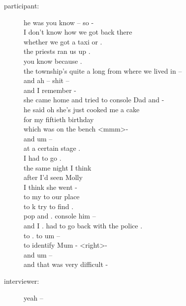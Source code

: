 \documentclass{article}
\newcommand{\turn}[2]{
\item[#1:] #2
}
\begin{document}
\begin{description}
\turn{participant}{he was you know -- so -\\
I don't know how we got back there\\
whether we got a taxi or .\\
the priests ran us up .\\
you know because .\\
the township's quite a long from where we lived in --\\
and ah -- shit --\\
and I remember -\\
she came home and tried to console Dad and -\\
he said oh she's just cooked me a cake\\
for my fiftieth birthday\\
which was on the bench \textless mmm\textgreater  -\\
and um --\\
at a certain stage .\\
I had to go .\\
the same night I think\\
after I'd seen Molly\\
I think she went -\\
to my to our place\\
to k try to find .\\
pop and . console him --\\
and I . had to go back with the police .\\
to . to um --\\
to identify Mum - \textless right\textgreater  -\\
and um --\\
and that was very difficult -}

\turn{interviewer}{yeah --}


\end{description}
\end{document}
